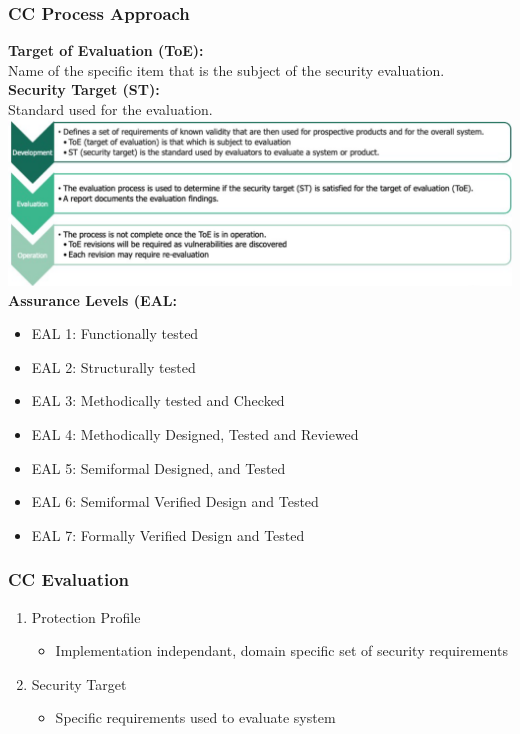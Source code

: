 \subsubsection{CC Process Approach}
\textbf{Target of Evaluation (ToE):}\\
Name of the specific item that is the subject of the security evaluation.\\
\textbf{Security Target (ST):}\\
Standard used for the evaluation.\\
\includegraphics[width=\linewidth]{../img/common_criteria.png}
\textbf{Assurance Levels (EAL:}\\
\begin{itemize}
    \item EAL 1: Functionally tested
    \item EAL 2: Structurally tested
    \item EAL 3: Methodically tested and Checked
    \item EAL 4: Methodically Designed, Tested and Reviewed
    \item EAL 5: Semiformal Designed, and Tested
    \item EAL 6: Semiformal Verified Design and Tested
    \item EAL 7: Formally Verified Design and Tested
\end{itemize}

\subsubsection{CC Evaluation}
\begin{enumerate}
    \item Protection Profile
    \begin{itemize}
        \item Implementation independant, domain specific set of security requirements
    \end{itemize}
    \item Security Target
    \begin{itemize}
        \item Specific requirements used to evaluate system
    \end{itemize}
\end{enumerate}

